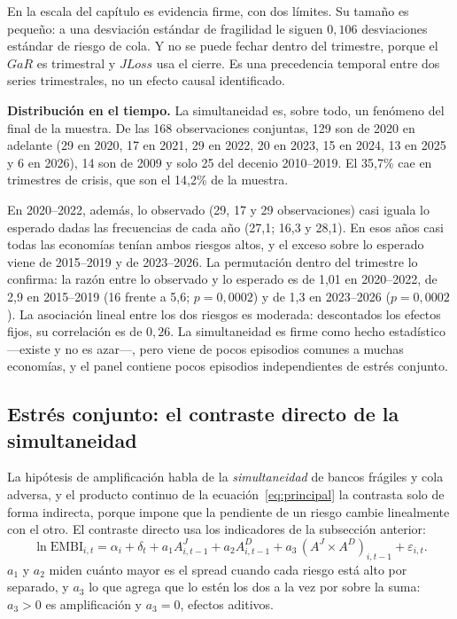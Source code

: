 En la escala del capítulo es evidencia firme, con dos límites. Su tamaño es pequeño: a una desviación estándar de fragilidad le siguen $0{,}106$ desviaciones estándar de riesgo de cola. Y no se puede fechar dentro del trimestre, porque el $GaR$ es trimestral y $JLoss$ usa el cierre. Es una precedencia temporal entre dos series trimestrales, no un efecto causal identificado.

\textbf{Distribución en el tiempo.} La simultaneidad es, sobre todo, un fenómeno del final de la muestra. De las 168 observaciones conjuntas, 129 son de 2020 en adelante (29 en 2020, 17 en 2021, 29 en 2022, 20 en 2023, 15 en 2024, 13 en 2025 y 6 en 2026), 14 son de 2009 y solo 25 del decenio 2010--2019. El 35,7\% cae en trimestres de crisis, que son el 14,2\% de la muestra.

En 2020--2022, además, lo observado (29, 17 y 29 observaciones) casi iguala lo esperado dadas las frecuencias de cada año (27,1; 16,3 y 28,1). En esos años casi todas las economías tenían ambos riesgos altos, y el exceso sobre lo esperado viene de 2015--2019 y de 2023--2026. La permutación dentro del trimestre lo confirma: la razón entre lo observado y lo esperado es de 1,01 en 2020--2022, de 2,9 en 2015--2019 (16 frente a 5,6; $p=0{,}0002$) y de 1,3 en 2023--2026 ($p=0{,}0002$). La asociación lineal entre los dos riesgos es moderada: descontados los efectos fijos, su correlación es de $0{,}26$. La simultaneidad es firme como hecho estadístico ---existe y no es azar---, pero viene de pocos episodios comunes a muchas economías, y el panel contiene pocos episodios independientes de estrés conjunto.

\subsection{Estrés conjunto: el contraste directo de la simultaneidad}
\label{sec:estres-conjunto}

La hipótesis de amplificación habla de la \emph{simultaneidad} de bancos frágiles y cola adversa, y el producto continuo de la ecuación~\eqref{eq:principal} la contrasta solo de forma indirecta, porque impone que la pendiente de un riesgo cambie linealmente con el otro. El contraste directo usa los indicadores de la subsección anterior:
\begin{equation}
\ln\mathrm{EMBI}_{i,t}=\alpha_i+\delta_t+a_1A^{J}_{i,t-1}+a_2A^{D}_{i,t-1}+a_3\,(A^{J}\times A^{D})_{i,t-1}+\varepsilon_{i,t}.
\label{eq:estres}
\end{equation}
$a_1$ y $a_2$ miden cuánto mayor es el spread cuando cada riesgo está alto por separado, y $a_3$ lo que agrega que lo estén los dos a la vez por sobre la suma: $a_3>0$ es amplificación y $a_3=0$, efectos aditivos.

